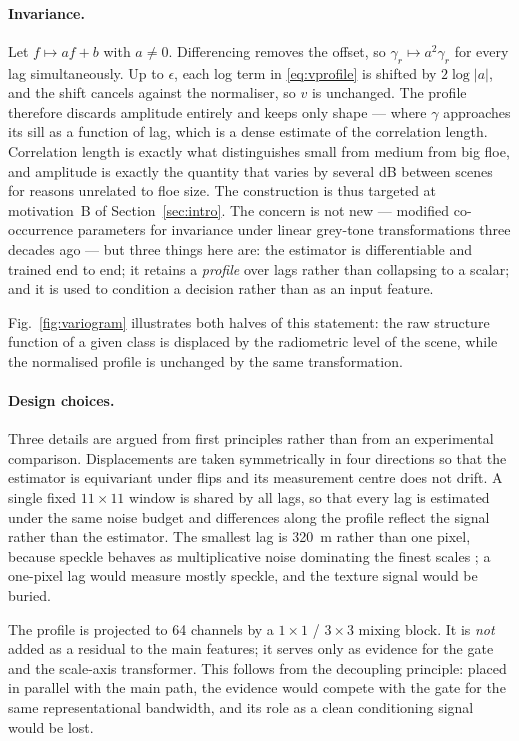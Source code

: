 \documentclass[preprint,12pt,authoryear]{elsarticle}
\begin{document}
\paragraph{Invariance.} Let $f \mapsto af + b$ with $a \neq 0$. Differencing
removes the offset, so $\gamma_r \mapsto a^2\gamma_r$ for every lag
simultaneously. Up to $\epsilon$, each log term in \eqref{eq:vprofile} is
shifted by $2\log|a|$, and the shift cancels against the normaliser, so
$v$ is unchanged. The profile therefore discards amplitude entirely and keeps
only shape --- where $\gamma$ approaches its sill as a function of lag, which is
a dense estimate of the correlation length. Correlation length is exactly what
distinguishes small from medium from big floe, and amplitude is exactly the
quantity that varies by several dB between scenes for reasons unrelated to floe
size. The construction is thus targeted at motivation~B of
Section~\ref{sec:intro}. The concern is not new --- \citet{shokr1991evaluation}
modified co-occurrence parameters for invariance under linear grey-tone
transformations three decades ago --- but three things here are: the estimator
is differentiable and trained end to end; it retains a \emph{profile} over lags
rather than collapsing to a scalar; and it is used to condition a decision
rather than as an input feature.

Fig.~\ref{fig:variogram} illustrates both halves of this statement: the raw
structure function of a given class is displaced by the radiometric level of the
scene, while the normalised profile is unchanged by the same transformation.

\paragraph{Design choices.} Three details are argued from first principles
rather than from an experimental comparison. Displacements are taken
symmetrically in four directions so that the estimator is equivariant under
flips and its measurement centre does not drift. A single fixed $11\times11$
window is shared by all lags, so that every lag is estimated under the same
noise budget and differences along the profile reflect the signal rather than
the estimator. The smallest lag is 320~m rather than one pixel, because speckle
behaves as multiplicative noise dominating the finest scales
\citep{lee1981speckle,argenti2013tutorial}; a one-pixel lag would measure mostly
speckle, and the texture signal would be buried.

The profile is projected to 64 channels by a $1\times1$ / $3\times3$ mixing
block. It is \emph{not} added as a residual to the main features; it serves only
as evidence for the gate and the scale-axis transformer. This follows from the
decoupling principle: placed in parallel with the main path, the evidence would
compete with the gate for the same representational bandwidth, and its role as a
clean conditioning signal would be lost.
\end{document}
